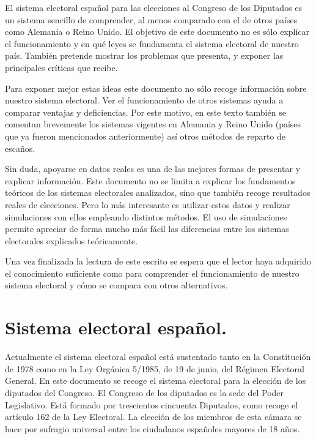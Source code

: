 \documentclass[11pt]{article}
\begin{document}
	El sistema electoral español para las elecciones al Congreso de los Diputados es un sistema sencillo de comprender, al menos comparado con el de otros países como Alemania o Reino Unido. El objetivo de este documento no es sólo explicar el funcionamiento y en qué leyes se fundamenta el sistema electoral de nuestro país. También pretende mostrar los problemas que presenta, y exponer las principales críticas que recibe. 
	
	Para exponer mejor estas ideas este documento no sólo recoge información sobre nuestro sistema electoral. Ver el funcionamiento de otros sistemas ayuda a comparar ventajas y deficiencias. Por este motivo, en este texto también se comentan brevemente los sistemas vigentes en Alemania y Reino Unido (países que ya fueron mencionados anteriormente) así otros métodos de reparto de escaños.
	
	Sin duda, apoyarse en datos reales es una de las mejores formas de presentar y explicar información. Este documento no se limita a explicar los fundamentos teóricos de los sistemas electorales analizados, sino que también recoge resultados reales de elecciones. Pero lo más interesante es utilizar estos datos y realizar simulaciones con ellos empleando distintos métodos. El uso de simulaciones permite apreciar de forma mucho más fácil las diferencias entre los sistemas electorales explicados teóricamente.
	
	Una vez finalizada la lectura de este escrito se espera que el lector haya adquirido el conocimiento suficiente como para comprender el funcionamiento de nuestro sistema electoral y cómo se compara con otros alternativos.
		
	\newpage
	
	\section{Sistema electoral español.}
	
	Actualmente el sistema electoral español está sustentado tanto en la Constitución de 1978 como en la Ley Orgánica 5/1985, de 19 de junio, del Régimen Electoral General. En este documento se recoge el sistema electoral para la elección de los diputados del Congreso. El Congreso de los diputados es la sede del Poder Legislativo. Está formado por trescientos cincuenta Diputados, como recoge el artículo 162 de la Ley Electoral. La elección de los miembros de esta cámara se hace por sufragio universal entre los ciudadanos españoles mayores de 18 años.
	
\end{document}
